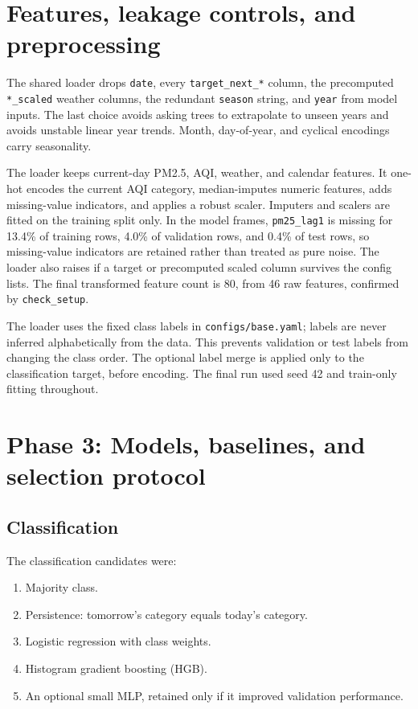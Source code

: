 \documentclass[11pt]{article}
\begin{document}
\section{Features, leakage controls, and preprocessing}

The shared loader drops \texttt{date}, every \texttt{target\_next\_*} column, the precomputed \texttt{*\_scaled} weather columns, the redundant \texttt{season} string, and \texttt{year} from model inputs. The last choice avoids asking trees to extrapolate to unseen years and avoids unstable linear year trends. Month, day-of-year, and cyclical encodings carry seasonality.

The loader keeps current-day PM2.5, AQI, weather, and calendar features. It one-hot encodes the current AQI category, median-imputes numeric features, adds missing-value indicators, and applies a robust scaler. Imputers and scalers are fitted on the training split only. In the model frames, \texttt{pm25\_lag1} is missing for 13.4\% of training rows, 4.0\% of validation rows, and 0.4\% of test rows, so missing-value indicators are retained rather than treated as pure noise. The loader also raises if a target or precomputed scaled column survives the config lists. The final transformed feature count is 80, from 46 raw features, confirmed by \texttt{check\_setup}.

The loader uses the fixed class labels in \texttt{configs/base.yaml}; labels are never inferred alphabetically from the data. This prevents validation or test labels from changing the class order. The optional label merge is applied only to the classification target, before encoding. The final run used seed 42 and train-only fitting throughout.

\section{Phase 3: Models, baselines, and selection protocol}

\subsection{Classification}

The classification candidates were:

\begin{enumerate}[leftmargin=1.4em]
  \item Majority class.
  \item Persistence: tomorrow's category equals today's category.
  \item Logistic regression with class weights.
  \item Histogram gradient boosting (HGB).
  \item An optional small MLP, retained only if it improved validation performance.
\end{enumerate}
\end{document}
